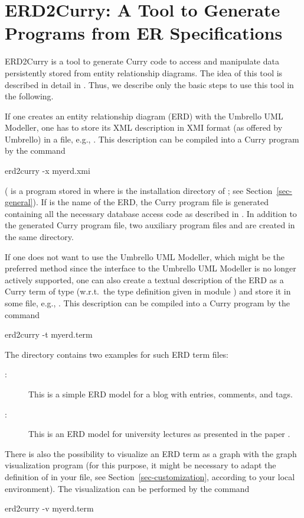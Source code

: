 \section{ERD2Curry: A Tool to Generate Programs from ER Specifications}
\label{sec-erd2curry}

ERD2Curry
is a tool to generate Curry code to access and manipulate data
persistently stored from
entity relationship diagrams.
The idea of this tool is described in detail in
\cite{BrasselHanusMueller08PADL}.
Thus, we describe only the basic steps to use this tool
in the following.

If one creates an entity relationship diagram (ERD)
with the Umbrello UML Modeller, one has to store its
XML description in XMI format (as offered by Umbrello)
in a file, e.g., .
This description can be compiled into a Curry program by the
command
\begin{curry}
erd2curry -x myerd.xmi
\end{curry}
( is a program stored in 
where \cyshome is the installation directory of \CYS;
see Section~\ref{sec-general}).
If  is the name of the ERD, the Curry program file
 is generated containing all the necessary
database access code as described in \cite{BrasselHanusMueller08PADL}.
In addition to the generated Curry program file,
two auxiliary program files
 and 
are created in the same directory.

If one does not want to use the Umbrello UML Modeller,
which might be the preferred method since the interface to the
Umbrello UML Modeller is no longer actively supported,
one can also create a textual description of the ERD
as a Curry term of type 
(w.r.t.\ the type definition given in module
)
and store it in some file, e.g., .
This description can be compiled into a Curry program by the
command
\begin{curry}
erd2curry -t myerd.term
\end{curry}
%
The directory 
contains two examples for such ERD term files:
\begin{description}
\item[:]
This is a simple ERD model for a blog with entries, comments,
and tags.
\item[:]
This is an ERD model for university lectures as
presented in the paper \cite{BrasselHanusMueller08PADL}.
\end{description}
%
There is also the possibility to visualize an ERD term
as a graph with the graph visualization program 
(for this purpose, it might be necessary to adapt the definition
of  in your \ccode{\curryrc} file,
see Section~\ref{sec-customization},
according to your local environment).
The visualization can be performed by the command
\begin{curry}
erd2curry -v myerd.term
\end{curry}

